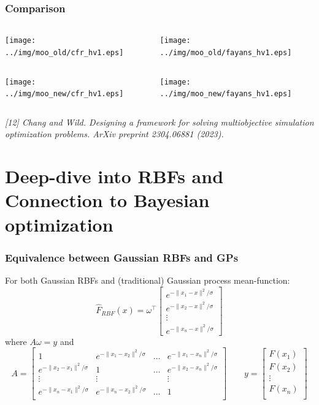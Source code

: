 \documentclass[aspectratio=169]{beamer}
\begin{document}
\begin{frame}\frametitle{Comparison}
\begin{columns}
\begin{column}{0.5\textwidth}
\texttt{[image: ../img/moo\_old/cfr\_hv1.eps]}
\end{column}
\begin{column}{0.5\textwidth}
\texttt{[image: ../img/moo\_old/fayans\_hv1.eps]}
\end{column}
\end{columns}
\begin{columns}
\begin{column}{0.5\textwidth}
\texttt{[image: ../img/moo\_new/cfr\_hv1.eps]}
\end{column}
\begin{column}{0.5\textwidth}
\texttt{[image: ../img/moo\_new/fayans\_hv1.eps]}
\end{column}
\end{columns}

\vfill

{\tiny\it
[12]
Chang and Wild.
Designing a framework for solving multiobjective simulation optimization problems.
ArXiv preprint 2304.06881 (2023).
}
\end{frame}

\section{Deep-dive into RBFs and Connection to Bayesian optimization}

\begin{frame}\frametitle{Equivalence between Gaussian RBFs and GPs}
For both Gaussian RBFs and (traditional) Gaussian process mean-function:
$$
{\hat F}_{RBF}(x) =
\omega^\top \left[ \begin{array}{c}
e^{-\|x_1 - x\|^2/\sigma}\\
e^{-\|x_2 - x\|^2/\sigma}\\
\vdots\\
e^{-\|x_n - x\|^2/\sigma}
\end{array} \right]
$$
\pause
where
$ A \omega = y $
and 
$$
A = 
\left[
\begin{array}{cccc}
1 & e^{-\|x_1 - x_2\|^2/\sigma} & \ldots & e^{-\|x_1 - x_n\|^2/\sigma} \\
e^{-\|x_2 - x_1\|^2/\sigma} & 1 & \ldots & e^{-\|x_2 - x_n\|^2/\sigma} \\
\vdots & \vdots &  & \vdots \\
e^{-\|x_n - x_1\|^2/\sigma} & e^{-\|x_n - x_2\|^2/\sigma} & \ldots & 1 \\
\end{array}
\right]
\qquad
y = 
\left[
\begin{array}{c}
F(x_1) \\
F(x_2) \\
\vdots \\
F(x_n) \\
\end{array}
\right]
$$

\end{frame}
\end{document}
